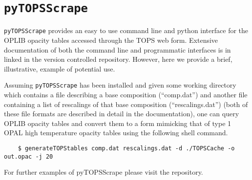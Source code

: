 \section{\texttt{pyTOPSScrape}}\label{apx:pytopsscrape}
\texttt{pyTOPSScrape} provides an easy to use command line and python interface
for the OPLIB opacity tables accessed through the TOPS web form. Extensive
documentation of both the command line and programmatic interfaces is in linked
in the version controlled repository. However, here we provide a brief,
illustrative, example of potential use.

Assuming \texttt{pyTOPSScrape} has been installed and given some working
directory which contains a file describing a base composition (``comp.dat'')
and another file containing a list of rescalings of that base composition
(``rescalings.dat'') (both of these file formats are described in detail in the
documentation), one can query OPLIB opacity tables and convert them to a form
mimicking that of type 1 OPAL high temperature opacity tables using the
following shell command.

\begin{verbatim}
	$ generateTOPStables comp.dat rescalings.dat -d ./TOPSCache -o out.opac -j 20
\end{verbatim}

\noindent For further examples of pyTOPSScrape please visit the repository.
